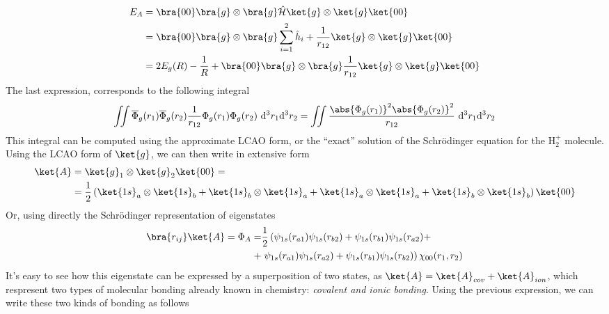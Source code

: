 \documentclass[a4paper, 11pt]{book}
\newcommand{\1}{\opr{\mathds{1}}}
\newcommand{\ddiff}[3][]{\ \mathrm{d}^{#1}#2\mathrm{d}^{#1}#3}
\newcommand{\ham}{\mathcal{H}}
\newcommand{\opr}[1]{\hat{#1}}
\newcommand{\cc}[1]{\overline{#1}}
\theoremstyle{plain}
\begin{document}
	\begin{equation}
		\begin{aligned}
			E_A&=\bra{00}\bra{g}\otimes\bra{g}\opr{\ham}\ket{g}\otimes\ket{g}\ket{00}\\
			&=\bra{00}\bra{g}\otimes\bra{g}\sum_{i=1}^2\opr{h}_i+\frac{1}{r_{12}}\ket{g}\otimes\ket{g}\ket{00}\\
			&=2E_g(R)-\frac{1}{R}+\bra{00}\bra{g}\otimes\bra{g}\frac{1}{r_{12}}\ket{g}\otimes\ket{g}\ket{00}
		\end{aligned}
		\label{eq:rayleighritzh2}
	\end{equation}
	The last expression, corresponds to the following integral
	\begin{equation*}
		\iint\cc{\Phi}_g(r_1)\cc{\Phi}_g(r_2)\frac{1}{r_{12}}\Phi_g(r_1)\Phi_g(r_2)\ddiff[3]{r_1}{r_2}=\iint\frac{\abs{\Phi_g(r_1)}^2\abs{\Phi_g(r_2)}^2}{r_{12}}\ddiff[3]{r_1}{r_2}
	\end{equation*}
	This integral can be computed using the approximate LCAO form, or the ``exact'' solution of the Schrödinger equation for the $\mathrm{H}_2^+$ molecule.\\
	Using the LCAO form of $\ket{g}$, we can then write in extensive form
	\begin{equation}
		\begin{aligned}
			\ket{A}&=\ket{g}_1\otimes\ket{g}_2\ket{00}=\\
			&=\frac{1}{2}\left( \ket{1s}_a\otimes\ket{1s}_b+\ket{1s}_b\otimes\ket{1s}_a+\ket{1s}_a\otimes\ket{1s}_a+\ket{1s}_b\otimes\ket{1s}_b \right)\ket{00}
		\end{aligned}
		\label{eq:eigenfunctionAh2}
	\end{equation}
	Or, using directly the Schrödinger representation of eigenstates
	\begin{equation}
		\begin{aligned}
			\bra{r_{ij}}\ket{A}=\Phi_A=&\frac{1}{2}\left( \psi_{1s}(r_{a1})\psi_{1s}(r_{b2})+\psi_{1s}(r_{b1})\psi_{1s}(r_{a2})+\right.\\
			+&\left.\psi_{1s}(r_{a1})\psi_{1s}(r_{a2})+\psi_{1s}(r_{b1})\psi_{1s}(r_{b2}) \right)\chi_{00}(r_1,r_2)
		\end{aligned}
		\label{eq:eigenfunctonAh2schr}
	\end{equation}
	It's easy to see how this eigenstate can be expressed by a superposition of two states, as $\ket{A}=\ket{A}_{cov}+\ket{A}_{ion}$, which respresent two types of molecular bonding already known in chemistry: \textit{covalent and ionic bonding}. Using the previous expression, we can write these two kinds of bonding as follows
\end{document}
